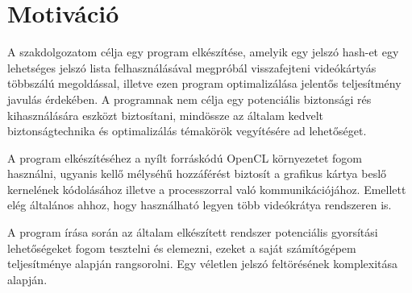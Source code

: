 \section{Motiváció}

A szakdolgozatom célja egy program elkészítése, amelyik egy jelszó hash-et egy lehetséges jelszó lista felhasználásával megpróbál visszafejteni videókártyás többszálú megoldással, illetve ezen program optimalizálása jelentős teljesítmény javulás érdekében. A programnak nem célja egy potenciális biztonsági rés kihasználására eszközt biztosítani, mindössze az általam kedvelt biztonságtechnika és optimalizálás témakörök vegyítésére ad lehetőséget.

A program elkészítéséhez a nyílt forráskódú OpenCL környezetet fogom használni, ugyanis kellő mélyséhű hozzáférést biztosít a grafikus kártya beslő kernelének kódolásához illetve a processzorral való kommunikációjához. Emellett elég általános ahhoz, hogy használható legyen több videókrátya rendszeren is.

A program írása során az általam elkészített rendszer potenciális gyorsítási lehetőségeket fogom tesztelni és elemezni, ezeket a saját számítógépem teljesítménye alapján rangsorolni. Egy véletlen jelszó feltörésének komplexitása alapján.